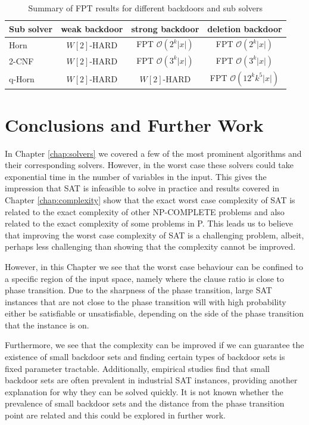 \begin{table}[]
    \centering
    \begin{tabular}{l c c c}
        \toprule
        Sub solver & weak backdoor & strong backdoor & deletion backdoor \\
        \midrule
        Horn & $W[2]$-HARD & FPT $\mathcal{O}(2^k |x|)$ & FPT $\mathcal{O}(2^k |x|)$\\
        2-CNF & $W[2]$-HARD & FPT $\mathcal{O}(3^k |x|)$ & FPT $\mathcal{O}(3^k |x|)$\\
        q-Horn & $W[2]$-HARD & $W[2]$-HARD & FPT $\mathcal{O}(12^k k^5 |x|)$ \\
        \bottomrule
    \end{tabular}
    \caption{Summary of FPT results for different backdoors and sub solvers 
    \cite{nishimura2004detecting, ramanujan2017linear, gaspers2016backdoors}}
    \label{tab:backdoor_fpt}
\end{table}

\section{Conclusions and Further Work}

In Chapter \ref{chap:solvers} we covered a few of the most prominent algorithms
and their corresponding solvers. However, in the worst case these solvers
could take exponential time in the number of variables in the input.
This gives the impression that SAT is infeasible to solve in practice
and results covered in Chapter \ref{chap:complexity} show that the exact worst case
complexity of SAT is related to the exact complexity of other NP-COMPLETE problems
and also related to the exact complexity of some problems in P.
This leads us to believe that improving the worst case complexity of SAT is a challenging problem, albeit,
perhaps less challenging than showing that the complexity cannot be improved.

However, in this Chapter we see that the worst case behaviour can be confined
to a specific region of the input space, namely where the clause ratio is close to phase transition.
Due to the sharpness of the phase transition, large SAT instances that are not close to the phase
transition will with high probability either be satisfiable or unsatisfiable, depending on the side
of the phase transition that the instance is on.

Furthermore, we see that the complexity can be improved if we can guarantee the existence
of small backdoor sets and finding certain types of backdoor sets is fixed parameter tractable.
Additionally, empirical studies find that small backdoor sets are often prevalent in
industrial SAT instances, providing another explanation for why they can be solved
quickly. It is not known whether the prevalence of small backdoor sets and the distance
from the phase transition point are related and this could be explored in further work.

